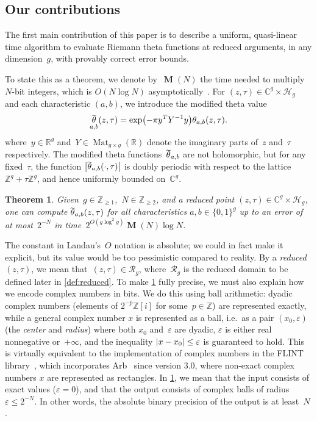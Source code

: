 \documentclass[12pt,oneside]{amsart}
\numberwithin{equation}{section}
\newtheorem{thm}[equation]{Theorem}
\theoremstyle{definition}
\newcommand{\Z}{\mathbb{Z}}
\newcommand{\R}{\mathbb{R}}
\newcommand{\red}{\mathcal{R}}
\newcommand{\C}{\mathbb{C}}
\newcommand{\Half}{\mathcal{H}}
\newcommand{\eps}{\varepsilon}
\DeclareMathOperator{\Mat}{Mat}
\DeclareMathOperator{\thetatilde}{\rlap{\raisebox{-0.1ex}{$\widetilde{\phantom{\,t}}$}}\theta}
\DeclareMathOperator{\Mul}{\mathbf{M}}
\DeclarePairedDelimiter{\abs}{|}{|}
\DeclarePairedDelimiter{\paren}{(}{)}
\begin{document}
\subsection{Our contributions}
\label{subsec:intro-main}

The first main contribution of this paper is to describe a uniform,
quasi-linear time algorithm to evaluate Riemann theta functions at reduced
arguments, in any dimension~$g$, with provably correct error bounds.

To state this as a theorem, we denote by~$\Mul(N)$ the time needed to multiply
$N$-bit integers, which is $O(N\log N)$
asymptotically~\cite{harveyIntegerMultiplicationTime2021}. For
$(z,\tau)\in \C^g\times \Half_g$ and each characteristic $(a,b)$, we introduce
the modified theta value
\begin{equation}
  \label{eq:thetatilde}
  \thetatilde_{a,b}(z,\tau) = \exp \paren[\big]{-\pi y^T Y^{-1} y} \theta_{a,b}(z,\tau).
\end{equation}
where~$y\in \R^g$ and~$Y\in \Mat_{g\times g}(\R)$ denote the imaginary parts
of~$z$ and~$\tau$ respectively.  The modified theta
functions~$\thetatilde_{a,b}$ are not holomorphic, but for any fixed~$\tau$,
the function $\abs[\big]{\thetatilde_{a,b}(\cdot, \tau)}$ is doubly periodic
with respect to the lattice~$\Z^g + \tau\Z^g$, and hence uniformly bounded
on~$\C^g$.

\begin{thm}
  \label{thm:main-intro}
  Given~$g\in \Z_{\geq 1}$,~$N\in \Z_{\geq 2}$, and a reduced point
  $(z,\tau)\in \C^g\times \Half_g$, one can compute $\thetatilde_{a,b}(z,\tau)$
  for all characteristics $a,b\in \{0,1\}^g$ up to an error of at most~$2^{-N}$
  in time~$2^{O(g\log^2 g)} \Mul(N)\log N$.
\end{thm}

The constant in Landau's~$O$ notation is absolute; we could in fact make it
explicit, but its value would be too pessimistic compared to reality. By a
\emph{reduced} $(z,\tau)$, we mean that~$(z,\tau)\in \red_g$, where~$\red_g$ is
the reduced domain to be defined later in \cref{def:reduced}. To make
\cref{thm:main-intro} fully precise, we must also explain how we encode complex
numbers in bits. We do this using ball arithmetic: dyadic complex numbers
(elements of $2^{-p}\Z[i]$ for some~$p\in \Z$) are represented exactly, while a
general complex number $x$ is represented as a ball, i.e.~as a pair
$(x_0,\eps)$ (the \emph{center} and \emph{radius}) where both $x_0$ and~$\eps$
are dyadic, $\eps$ is either real nonnegative or~$+\infty$, and the inequality
$\abs{x-x_0}\leq \eps$ is guaranteed to hold. This is virtually equivalent to
the implementation of complex numbers in the FLINT
library~\cite{theflintteamFLINTFastLibrary2024}, which incorporates
Arb~\cite{johanssonArbEfficientArbitraryprecision2017} since version 3.0, where
non-exact complex numbers $x$ are represented as rectangles. In
\cref{thm:main-intro}, we mean that the input consists of exact values
($\eps = 0$), and that the output consists of complex balls of radius
$\eps\leq 2^{-N}$. In other words, the absolute binary precision of the output
is at least~$N$.
\end{document}
